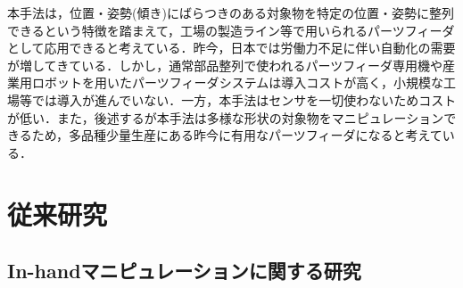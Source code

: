 \documentclass[a4paper,twoside,12pt,papersize, dvipdfmx]{iirthesis}
\begin{document}
本手法は，位置・姿勢(傾き)にばらつきのある対象物を特定の位置・姿勢に整列できるという特徴を踏まえて，工場の製造ライン等で用いられるパーツフィーダとして応用できると考えている．昨今，日本では労働力不足に伴い自動化の需要が増してきている．しかし，通常部品整列で使われるパーツフィーダ専用機や産業用ロボットを用いたパーツフィーダシステムは導入コストが高く，小規模な工場等では導入が進んでいない．一方，本手法はセンサを一切使わないためコストが低い．また，後述するが本手法は多様な形状の対象物をマニピュレーションできるため，多品種少量生産にある昨今に有用なパーツフィーダになると考えている．


\section{従来研究}\label{sec::intro::relatedresearch}
\subsection{In-handマニピュレーションに関する研究}
\end{document}
